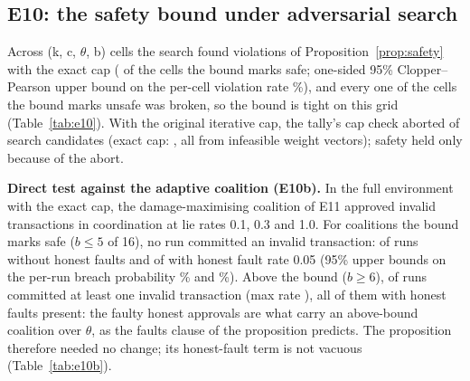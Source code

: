 \subsection{E10: the safety bound under adversarial search}
Across \EtenCells{} (k, c, $\theta$, b) cells the search found \EtenViolations{} violations of
Proposition~\ref{prop:safety} with the exact cap (\EtenViolations{} of the \EtenSafeCells{} cells the bound marks safe;
one-sided 95\% Clopper--Pearson upper bound on the per-cell violation rate \EtenViolationsCp{}\%), and every one of the \EtenUnsafeCells{} cells the bound marks unsafe was
broken, so the bound is tight on this grid (Table~\ref{tab:e10}). With the original iterative cap, the tally's cap check
aborted \EtenIterAbortFrac{} of search candidates (exact cap: \EtenExactAbortFrac{}, all from infeasible weight
vectors); safety held only because of the abort.

\textbf{Direct test against the adaptive coalition (E10b).} In the full environment with the exact cap, the
damage-maximising coalition of E11 approved invalid transactions in coordination at lie rates 0.1, 0.3 and 1.0.
For coalitions the bound marks safe ($b\le5$ of 16), no run committed an invalid transaction: \EtenEnvBreachSafeZero{} of
\EtenEnvRunsSafeZero{} runs without honest faults and \EtenEnvBreachSafeFive{} of \EtenEnvRunsSafeFive{} with honest fault
rate 0.05 (95\% upper bounds on the per-run breach probability \EtenEnvBreachSafeZeroCp{}\% and
\EtenEnvBreachSafeFiveCp{}\%). Above the bound ($b\ge6$), \EtenEnvBreachUnsafe{} of \EtenEnvRunsUnsafe{} runs committed at least one invalid
transaction (max rate \EtenEnvMaxInvalidUnsafe{}), all of them with honest faults present: the faulty honest approvals
are what carry an above-bound coalition over $\theta$, as the faults clause of the proposition predicts. The proposition
therefore needed no change; its honest-fault term is not vacuous (Table~\ref{tab:e10b}).




